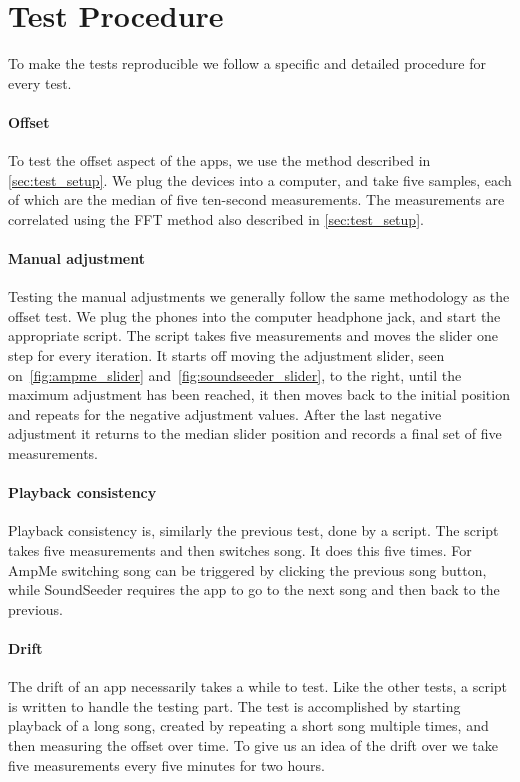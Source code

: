 \section{Test Procedure}\label{sec:test_procedure}
To make the tests reproducible we follow a specific and detailed
procedure for every test.

\paragraph{Offset}
To test the offset aspect of the apps, we use the method described in
\cref{sec:test_setup}. We plug the devices into a computer, and take
five samples, each of which are the median of five ten-second measurements. The
measurements are correlated using the \ac{FFT} method also described in
\cref{sec:test_setup}.

\paragraph{Manual adjustment}
Testing the manual adjustments we generally follow the same methodology as
the offset test. We plug the phones into the computer headphone jack,
and start the appropriate script. The script takes five measurements and moves the
slider one step for every iteration. It starts off moving the adjustment
slider, seen on~\vref{fig:ampme_slider} and~\vref{fig:soundseeder_slider}, to the right, until the maximum adjustment has
been reached, it then moves back to the initial position and repeats for
the negative adjustment values. After the last negative adjustment it
returns to the median slider position and records a final set of
five measurements.

\paragraph{Playback consistency}
Playback consistency is, similarly the previous test, done by a script. The
script takes five measurements and then switches song. It does this
five times. For AmpMe switching song can be triggered by clicking the
previous song button, while SoundSeeder requires the app to go to the
next song and then back to the previous.

\paragraph{Drift}
The drift of an app necessarily takes a while to test. Like the other
tests, a script is written to handle the testing part. The test is
accomplished by starting playback of a long song, created by repeating
a short song multiple times, and then measuring the offset over time. To
give us an idea of the drift over we take five measurements every five minutes
for two hours.
